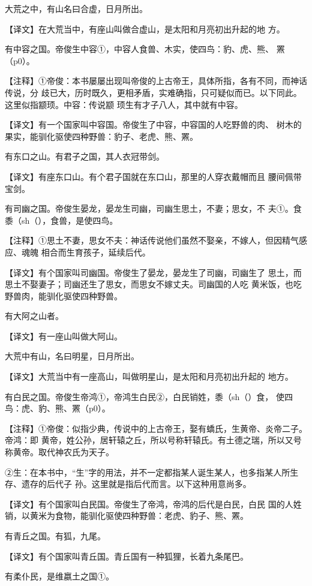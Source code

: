 \documentclass[a4paper,12pt,UTF8,twoside]{ctexbook}
\begin{document}
大荒之中，有山名曰合虚，日月所出。

【译文】在大荒当中，有座山叫做合虚山，是太阳和月亮初出升起的地 方。

有中容之国。帝俊生中容①，中容人食兽、木实，使四鸟：豹、虎、熊、 罴（p0）。

【注释】①帝俊：本书屡屡出现叫帝俊的上古帝王，具体所指，各有不同，而神话传说，分 歧已大，历时既久，更相矛盾，实难确指，只可疑似而已。以下同此。这里似指颛顼。中容：传说颛 顼生有才子八人，其中就有中容。

【译文】有一个国家叫中容国。帝俊生了中容，中容国的人吃野兽的肉、 树木的果实，能驯化驱使四种野兽：豹子、老虎、熊、罴。

有东口之山。有君子之国，其人衣冠带剑。

【译文】有座东口山。有个君子国就在东口山，那里的人穿衣戴帽而且 腰间佩带宝剑。

有司幽之国。帝俊生晏龙，晏龙生司幽，司幽生思土，不妻；思女，不 夫①。食黍（sh（），食兽，是使四鸟。

【注释】①思土不妻，思女不夫：神话传说他们虽然不娶亲，不嫁人，但因精气感应、魂魄 相合而生育孩子，延续后代。

【译文】有个国家叫司幽国。帝俊生了晏龙，晏龙生了司幽，司幽生了 思土，而思土不娶妻子；司幽还生了思女，而思女不嫁丈夫。司幽国的人吃 黄米饭，也吃野兽肉，能驯化驱使四种野兽。

有大阿之山者。

【译文】有一座山叫做大阿山。

大荒中有山，名曰明星，日月所出。

【译文】大荒当中有一座高山，叫做明星山，是太阳和月亮初出升起的 地方。

有白民之国。帝俊生帝鸿①，帝鸿生白民②，白民销姓，黍（sh（）食， 使四鸟：虎、豹、熊、罴（p0）。

【注释】①帝俊：似指少典，传说中的上古帝王，娶有蟜氏，生黄帝、炎帝二子。帝鸿：即 黄帝，姓公孙，居轩辕之丘，所以号称轩辕氏。有土德之瑞，所以又号称黄帝。取代神农氏为天子。

②生：在本书中，“生”字的用法，并不一定都指某人诞生某人，也多指某人所生存、遗存的后代子 孙。这里就是指后代而言。以下这种用意尚多。

【译文】有个国家叫白民国。帝俊生了帝鸿，帝鸿的后代是白民，白民 国的人姓销，以黄米为食物，能驯化驱使四种野兽：老虎、豹子、熊、罴。

有青丘之国。有狐，九尾。

【译文】有个国家叫青丘国。青丘国有一种狐狸，长着九条尾巴。

有柔仆民，是维嬴土之国①。
\end{document}
